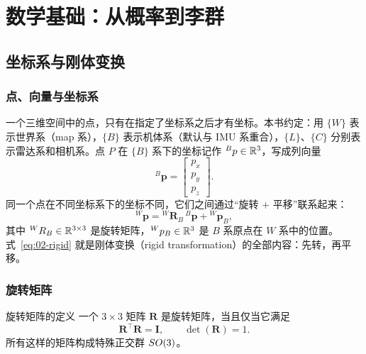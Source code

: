 \chapter{数学基础：从概率到李群}\label{ch:02-math}


\section{坐标系与刚体变换}\label{sec:02-frame}

\subsection{点、向量与坐标系}

一个三维空间中的点，只有在指定了坐标系之后才有坐标。本书约定：用 $\{W\}$ 表示世界系（map 系），$\{B\}$ 表示机体系（默认与 IMU 系重合），$\{L\}$、$\{C\}$ 分别表示雷达系和相机系。点 $P$ 在 $\{B\}$ 系下的坐标记作 ${}^{B}p\in\mathbb{R}^{3}$，写成列向量
\begin{equation}
{}^{B}\bm{p}=\begin{bmatrix}p_x\\p_y\\p_z\end{bmatrix}.
\end{equation}
同一个点在不同坐标系下的坐标不同，它们之间通过“旋转 + 平移”联系起来：
\begin{equation}
{}^{W}\bm{p}={}^{W}\bm{R}_{B}\,{}^{B}\bm{p}+{}^{W}\bm{p}_{B},
\label{eq:02-rigid}
\end{equation}
其中 ${}^{W}R_{B}\in\mathbb{R}^{3\times3}$ 是旋转矩阵，${}^{W}p_{B}\in\mathbb{R}^{3}$ 是 $B$ 系原点在 $W$ 系中的位置。式~\eqref{eq:02-rigid} 就是刚体变换（rigid transformation）的全部内容：先转，再平移。

\subsection{旋转矩阵}

\begin{keybox}{旋转矩阵的定义}
一个 $3\times3$ 矩阵 $\bm{R}$ 是旋转矩阵，当且仅当它满足
\begin{equation}
\bm{R}^{\top}\bm{R}=\bm{I},\qquad \det(\bm{R})=1.
\label{eq:02-so3def}
\end{equation}
所有这样的矩阵构成特殊正交群 $SO(3)$。
\end{keybox}

